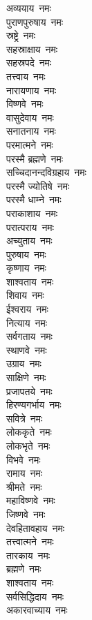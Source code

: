 \begin{multicols}{2}
\begin{flushleft}
अव्ययाय~नमः\\
पुराणपुरुषाय~नमः\\
स्रष्ट्रे~नमः\\
सहस्राक्षाय~नमः\\
सहस्रपदे~नमः\\
तत्त्वाय~नमः\\
नारायणाय~नमः\\
विष्णवे~नमः\\
वासुदेवाय~नमः\\
सनातनाय~नमः\hfill{}\\
परमात्मने~नमः\\
परस्मै ब्रह्मणे~नमः\\
सच्चिदानन्दविग्रहाय~नमः\\
परस्मै ज्योतिषे~नमः\\
परस्मै धाम्ने~नमः\\
पराकाशाय~नमः\\
परात्पराय~नमः\\
अच्युताय~नमः\\
पुरुषाय~नमः\\
कृष्णाय~नमः\hfill{}\\
शाश्वताय~नमः\\
शिवाय~नमः\\
ईश्वराय~नमः\\
नित्याय~नमः\\
सर्वगताय~नमः\\
स्थाणवे~नमः\\
उग्राय~नमः\\
साक्षिणे~नमः\\
प्रजापतये~नमः\\
हिरण्यगर्भाय~नमः\hfill{}\\
सवित्रे~नमः\\
लोककृते~नमः\\
लोकभृते~नमः\\
विभवे~नमः\\
रामाय~नमः\\
श्रीमते~नमः\\
महाविष्णवे~नमः\\
जिष्णवे~नमः\\
देवहितावहाय~नमः\\
तत्त्वात्मने~नमः\hfill{}\\
तारकाय~नमः\\
ब्रह्मणे~नमः\\
शाश्वताय~नमः\\
सर्वसिद्धिदाय~नमः\\
अकारवाच्याय~नमः\\

\end{flushleft}
\end{multicols}
